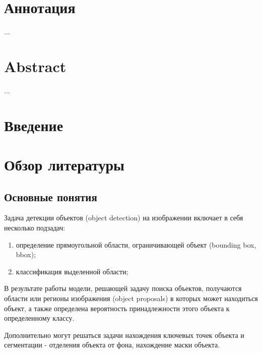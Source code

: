 \documentclass[a4paper,14pt]{article}
\begin{document}
    

    \section*{\normalsize \hfill Аннотация \hfill}

    ...

    \sloppy
    \newpage

    \section*{\normalsize \hfill Abstract \hfill}

    ...

    \newpage

    \tableofcontents
    \pagebreak

    \section*{Введение}


    \newpage


    \section{Обзор литературы}

    \subsection{Основные понятия}

    Задача детекции объектов (object detection) на изображении включает в себя несколько подзадач:
    \begin{enumerate}
        [1)]
        \itemsep0em
        \item определение прямоугольной области, ограничивающей объект (bounding box, bbox);
        \item классификация выделенной области;
    \end{enumerate}
    В результате работы модели, решающей задачу поиска объектов, получаются области или регионы изображения (object proposals) в которых может находиться объект, а также определена вероятность принадлежности этого объекта к определенному классу.

    Дополнительно могут решаться задачи нахождения ключевых точек объекта и сегментации - отделения объекта от фона, нахождение маски объекта.
\end{document}
